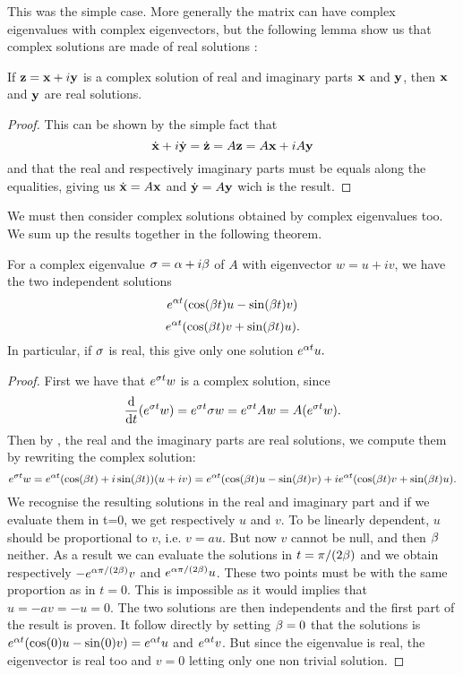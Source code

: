 This was the simple case. More generally the matrix can have complex eigenvalues with complex eigenvectors, but the following lemma show us that complex solutions are made of real solutions :
\begin{lemme} \label{lem:complex}
If $\mathbf{z}=\mathbf{x}+i\mathbf{y}$ is a complex solution of real and imaginary parts $\mathbf{x}$ and $\mathbf{y}$, then $\mathbf{x}$ and $\mathbf{y}$ are real solutions.
\end{lemme}
\begin{proof}
This can be shown by the simple fact that
\[\dot{\mathbf{x}}+i\dot{\mathbf{y}} =\dot{\mathbf{z}} = A\mathbf{z} = A\mathbf{x}+iA\mathbf{y} \]
and that the real and respectively imaginary parts must be equals along the equalities, giving us $\dot{\mathbf{x}}=A\mathbf{x}$ and $\dot{\mathbf{y}}=A\mathbf{y}$ wich is the result.
\end{proof}
We must then consider complex solutions obtained by complex eigenvalues too. We sum up the results together in the following theorem.
\begin{theoreme} \label{th:eigensolutions}
For a complex eigenvalue $\sigma=\alpha+i\beta$ of $A$ with eigenvector $w=u+iv$, we have the two independent solutions
\[e^{\alpha t}(\cos(\beta t)u - \sin(\beta t)v)\] 
\[e^{\alpha t}(\cos(\beta t)v + \sin(\beta t)u).\] 
In particular, if $\sigma$ is real, this give only one solution $e^{\alpha t}u.$ 
\end{theoreme}
\begin{proof}
First we have that $e^{\sigma t}w$ is a complex solution, since 
\[\frac{\mathrm{d}}{\mathrm{d} t}(e^{\sigma t}w) = e^{\sigma t}\sigma w = e^{\sigma t}Aw = A(e^{\sigma t}w).\]
Then by , the real and the imaginary parts are real solutions, we compute them by rewriting the complex solution:
\[e^{\sigma t}w = e^{\alpha t}(\cos(\beta t) + i\sin(\beta t))(u+iv)
= e^{\alpha t}(\cos(\beta t)u - \sin(\beta t)v) + ie^{\alpha t}(\cos(\beta t)v + \sin(\beta t)u).\]
We recognise the resulting solutions in the real and imaginary part and if we evaluate them in t=0, we get respectively $u$ and $v$. To be linearly dependent, $u$ should be proportional to $v$, i.e. $v=au$. But now $v$ cannot be null, and then $\beta$ neither. As a result we can evaluate the solutions in $t=\pi/(2\beta)$ and we obtain respectively $-e^{\alpha\pi/(2\beta)}v$ and $e^{\alpha\pi/(2\beta)}u$. These two points must be with the same proportion as in $t=0$. This is impossible as it would implies that $u=-av=-u=0$. The two solutions are then independents and the first part of the result is proven. It follow directly by setting $\beta=0$ that the solutions is $e^{\alpha t}(\cos(0)u - \sin(0)v) = e^{\alpha t}u$ and  $e^{\alpha t}v$. But since the eigenvalue is real, the eigenvector is real too and $v=0$ letting only one non trivial solution.
\end{proof}
